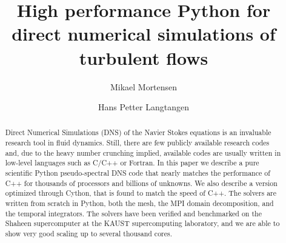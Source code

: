 \documentclass[final,3p,times,twocolumn]{elsarticle}
\begin{document}
\begin{frontmatter}



\title{High performance Python for direct numerical simulations of turbulent flows}


\author[a,b]{Mikael Mortensen}
\address[a]{University of Oslo, Moltke Moes vei 35, 0851 Oslo, Norway}
\address[b]{Center for Biomedical Computing at Simula Research Laboratory, P.O.Box 134, N-1325 Lysaker, Norway}
\author[a,b]{Hans Petter Langtangen}


\newcommand{\hpl}[1]{({\bf hpl comment:} \emph{#1})}






\begin{abstract}
Direct Numerical Simulations (DNS) of the Navier Stokes equations is an
invaluable research tool in fluid dynamics. Still, there are few publicly
available research codes and, due to the heavy number crunching implied,
available codes are usually written in low-level
languages such as C/C++ or Fortran.
In this paper we describe a pure scientific Python pseudo-spectral DNS code
that nearly matches the performance of C++ for thousands of processors
and billions of unknowns. We also describe a version optimized through Cython, 
that is found to match the speed of C++. The solvers are written from scratch 
in Python, both the mesh, the MPI domain decomposition, and the temporal 
integrators. The solvers have been verified and benchmarked on the Shaheen 
supercomputer at the KAUST supercomputing laboratory, and we are able to show 
very good scaling up to several thousand cores.


\end{abstract}
\end{frontmatter}
\end{document}
